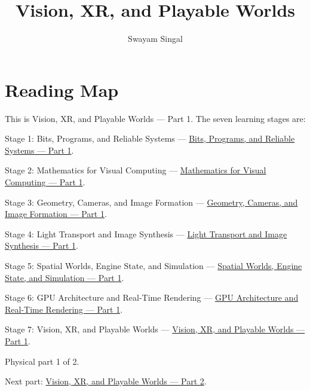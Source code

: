 \documentclass[11pt,twoside,openany]{book}
\title{Vision, XR, and Playable Worlds}
\author{Swayam Singal}
\begin{document}
\maketitle
\begin{center}\end{center}
\chapter*{Reading Map}
\hypertarget{volume-reading-map}{}
\noindent This is Vision, XR, and Playable Worlds --- Part 1. The seven learning stages are:
\par\noindent Stage 1: Bits, Programs, and Reliable Systems --- \href{../01-Bits-Programs-and-Reliable-Systems-P01/main.pdf}{Bits, Programs, and Reliable Systems — Part 1}.
\par\noindent Stage 2: Mathematics for Visual Computing --- \href{../02-Mathematics-for-Visual-Computing-P01/main.pdf}{Mathematics for Visual Computing — Part 1}.
\par\noindent Stage 3: Geometry, Cameras, and Image Formation --- \href{../03-Geometry-Cameras-and-Image-Formation-P01/main.pdf}{Geometry, Cameras, and Image Formation — Part 1}.
\par\noindent Stage 4: Light Transport and Image Synthesis --- \href{../04-Light-Transport-and-Image-Synthesis-P01/main.pdf}{Light Transport and Image Synthesis — Part 1}.
\par\noindent Stage 5: Spatial Worlds, Engine State, and Simulation --- \href{../05-Spatial-Worlds-Engine-State-and-Simulation-P01/main.pdf}{Spatial Worlds, Engine State, and Simulation — Part 1}.
\par\noindent Stage 6: GPU Architecture and Real-Time Rendering --- \href{../06-GPU-Architecture-and-Real-Time-Rendering-P01/main.pdf}{GPU Architecture and Real-Time Rendering — Part 1}.
\par\noindent Stage 7: Vision, XR, and Playable Worlds --- \href{../07-Vision-XR-and-Playable-Worlds-P01/main.pdf}{Vision, XR, and Playable Worlds — Part 1}.
\par\noindent Physical part 1 of 2.
\par\noindent Next part: \href{../07-Vision-XR-and-Playable-Worlds-P02/main.pdf}{Vision, XR, and Playable Worlds — Part 2}.
\tableofcontents
\mainmatter
\setcounter{chapter}{0}







\label{stagechaptersend:07-Vision-XR-and-Playable-Worlds}
\appendix
\end{document}
